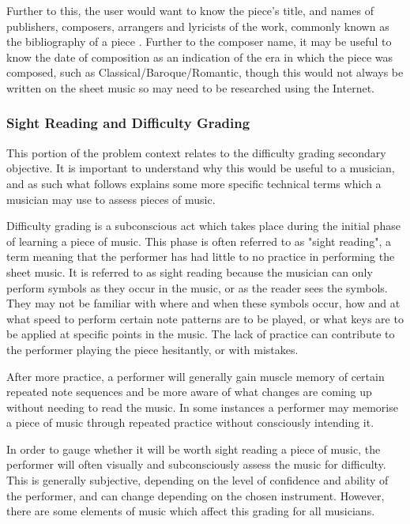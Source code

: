 Further to this, the user would want to know the piece's title, and names of publishers, composers, arrangers and lyricists of the work, commonly known as the bibliography of a piece \parencite{MIR}. Further to the composer name, it may be useful to know the date of composition as an indication of the era in which the piece was composed, such as Classical/Baroque/Romantic, though this would not always be written on the sheet music so may need to be researched using the Internet.

\subsubsection{Sight Reading and Difficulty Grading}
This portion of the problem context relates to the difficulty grading secondary objective. It is important to understand why this would be useful to a musician, and as such what follows explains some more specific technical terms which a musician may use to assess pieces of music.


Difficulty grading is a subconscious act which takes place during the initial phase of learning a piece of music. This phase is often referred to as "sight reading", a term meaning that the performer has had little to no practice in performing the sheet music. %
 It is referred to as sight reading because the musician can only perform symbols as they occur in the music, or as the reader sees the symbols. They may not be familiar with where and when these symbols occur, how and at what speed to perform certain note patterns are to be played, or what keys are to be applied at specific points in the music. The lack of practice can contribute to the performer playing the piece hesitantly, or with mistakes.

After more practice, a performer will generally gain muscle memory of certain repeated note sequences and be more aware of what changes are coming up without needing to read the music. In some instances a performer may memorise a piece of music through repeated practice without consciously intending it. 

In order to gauge whether it will be worth sight reading a piece of music, the performer will often visually and subconsciously assess the music for difficulty. This is generally subjective, depending on the level of confidence and ability of the performer, and can change depending on the chosen instrument. However, there are some elements of music which affect this grading for all musicians.

